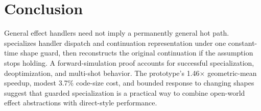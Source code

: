 \section{Conclusion}
\label{sec:conclusion}

General effect handlers need not imply a permanently general hot path. \system
specializes handler dispatch and continuation representation under one
constant-time shape guard, then reconstructs the original continuation if the
assumption stops holding. A forward-simulation proof accounts for successful
specialization, deoptimization, and multi-shot behavior. The prototype's
1.46$\times$ geometric-mean speedup, modest 3.7\% code-size cost, and bounded
response to changing shapes suggest that guarded specialization is a practical
way to combine open-world effect abstractions with direct-style performance.



